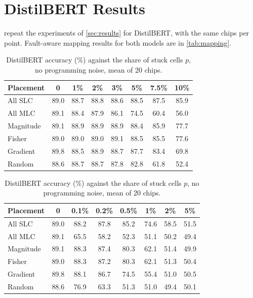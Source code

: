 \section{DistilBERT Results}\label{app:distilbert}

 repeat the experiments of
\cref{sec:results} for DistilBERT, with the same chips per point. Fault-aware mapping results for both
models are in \cref{tab:mapping}.

\begin{table}[h!]
\begin{minipage}[t]{0.48\textwidth}
\centering\footnotesize
\caption{DistilBERT accuracy (\%) against programming noise $\sigma$, mean of 5 chips.}\label{tab:d-noise}
\setlength{\tabcolsep}{4pt}
\begin{tabular}{@{}lccccccc@{}}
\toprule
Placement & 0 & 1\% & 2\% & 3\% & 5\% & 7.5\% & 10\% \\
\midrule
All SLC   & 89.0 & 88.7 & 88.8 & 88.6 & 88.5 & 87.5 & 85.9 \\
All MLC   & 89.1 & 88.4 & 87.9 & 86.1 & 74.5 & 60.4 & 56.0 \\
Magnitude & 89.1 & 88.9 & 88.9 & 88.9 & 88.4 & 85.9 & 77.7 \\
Fisher    & 89.0 & 89.0 & 89.0 & 89.1 & 88.5 & 85.5 & 77.6 \\
Gradient  & 89.8 & 88.5 & 88.9 & 88.7 & 87.7 & 83.4 & 69.8 \\
Random    & 88.6 & 88.7 & 88.7 & 87.8 & 82.8 & 61.8 & 52.4 \\
\bottomrule
\end{tabular}
\end{minipage}\hfill
\begin{minipage}[t]{0.48\textwidth}
\centering\footnotesize
\caption{DistilBERT accuracy (\%) against the share of stuck cells $p$, no programming noise, mean of 20
chips.}\label{tab:d-fault}
\setlength{\tabcolsep}{4pt}
\begin{tabular}{@{}lccccccc@{}}
\toprule
Placement & 0 & 0.1\% & 0.2\% & 0.5\% & 1\% & 2\% & 5\% \\
\midrule
All SLC   & 89.0 & 88.2 & 87.8 & 85.2 & 74.6 & 58.5 & 51.5 \\
All MLC   & 89.1 & 65.5 & 58.2 & 52.3 & 51.1 & 50.2 & 49.4 \\
Magnitude & 89.1 & 88.3 & 87.4 & 80.3 & 62.1 & 51.4 & 49.9 \\
Fisher    & 89.0 & 88.3 & 87.2 & 80.3 & 62.1 & 51.3 & 50.4 \\
Gradient  & 89.8 & 88.1 & 86.7 & 74.5 & 55.4 & 51.0 & 50.5 \\
Random    & 88.6 & 76.9 & 63.3 & 51.3 & 51.0 & 49.4 & 50.1 \\
\bottomrule
\end{tabular}
\end{minipage}
\end{table}

